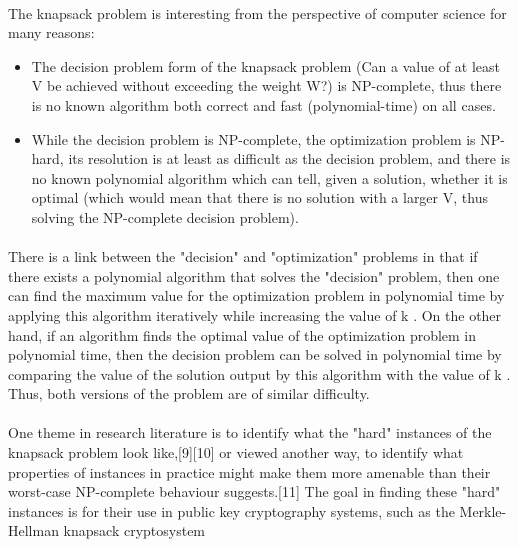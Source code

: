 \documentclass{article}
\begin{document}
\paragraph{}
The knapsack problem is interesting from the perspective of computer science for many reasons:

\begin{itemize}
 \item The decision problem form of the knapsack problem (Can a value of at least V be achieved without exceeding the weight W?) is NP-complete, thus there is no known algorithm both correct and fast (polynomial-time) on all cases.
 \item While the decision problem is NP-complete, the optimization problem is NP-hard, its resolution is at least as difficult as the decision problem, and there is no known polynomial algorithm which can tell, given a solution, whether it is optimal (which would mean that there is no solution with a larger V, thus solving the NP-complete decision problem).
\end{itemize}

\paragraph{}
There is a link between the "decision" and "optimization" problems in that if there exists a polynomial algorithm that solves the "decision" problem, then one can find the maximum value for the optimization problem in polynomial time by applying this algorithm iteratively while increasing the value of k . On the other hand, if an algorithm finds the optimal value of the optimization problem in polynomial time, then the decision problem can be solved in polynomial time by comparing the value of the solution output by this algorithm with the value of k . Thus, both versions of the problem are of similar difficulty.

\paragraph{}
One theme in research literature is to identify what the "hard" instances of the knapsack problem look like,[9][10] or viewed another way, to identify what properties of instances in practice might make them more amenable than their worst-case NP-complete behaviour suggests.[11] The goal in finding these "hard" instances is for their use in public key cryptography systems, such as the Merkle-Hellman knapsack cryptosystem
\end{document}
